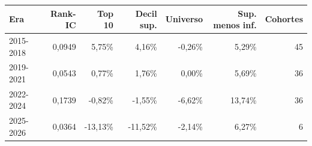 \begin{tabular}{lrrrrrr}
\toprule
Era & Rank-IC & Top 10 & Decil sup. & Universo & Sup. menos inf. & Cohortes \\
\midrule
2015-2018 & 0,0949 & 5,75\% & 4,16\% & -0,26\% & 5,29\% & 45 \\
2019-2021 & 0,0543 & 0,77\% & 1,76\% & 0,00\% & 5,69\% & 36 \\
2022-2024 & 0,1739 & -0,82\% & -1,55\% & -6,62\% & 13,74\% & 36 \\
2025-2026 & 0,0364 & -13,13\% & -11,52\% & -2,14\% & 6,27\% & 6 \\
\bottomrule
\end{tabular}
